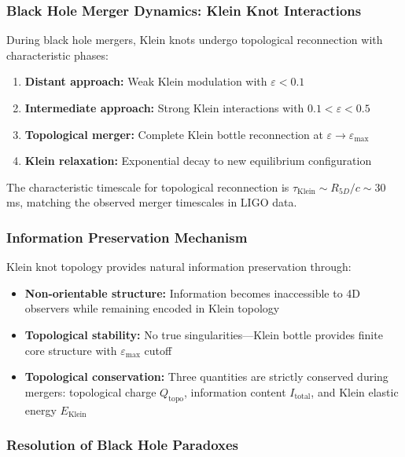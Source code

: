 \documentclass[12pt]{iopart}
\begin{document}
\subsubsection{Black Hole Merger Dynamics: Klein Knot Interactions}

During black hole mergers, Klein knots undergo topological reconnection with characteristic phases:
\begin{enumerate}
\item \textbf{Distant approach:} Weak Klein modulation with $\varepsilon < 0.1$
\item \textbf{Intermediate approach:} Strong Klein interactions with $0.1 < \varepsilon < 0.5$  
\item \textbf{Topological merger:} Complete Klein bottle reconnection at $\varepsilon \to \varepsilon_{\max}$
\item \textbf{Klein relaxation:} Exponential decay to new equilibrium configuration
\end{enumerate}

The characteristic timescale for topological reconnection is $\tau_{\text{Klein}} \sim R_{5D}/c \sim 30$ ms, matching the observed merger timescales in LIGO data.

\subsubsection{Information Preservation Mechanism}

Klein knot topology provides natural information preservation through:
\begin{itemize}
\item \textbf{Non-orientable structure:} Information becomes inaccessible to 4D observers while remaining encoded in Klein topology
\item \textbf{Topological stability:} No true singularities—Klein bottle provides finite core structure with $\varepsilon_{\max}$ cutoff
\item \textbf{Topological conservation:} Three quantities are strictly conserved during mergers: topological charge $Q_{\text{topo}}$, information content $I_{\text{total}}$, and Klein elastic energy $E_{\text{Klein}}$
\end{itemize}

\subsubsection{Resolution of Black Hole Paradoxes}
\end{document}
